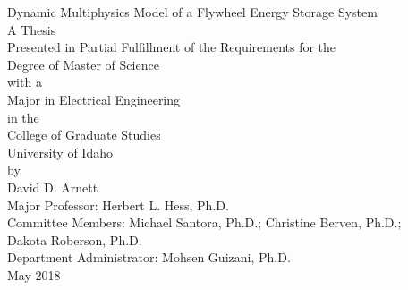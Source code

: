 \begin{titlepage}
    \begin{center}
        \vspace*{3.0cm}
        
        Dynamic Multiphysics Model of a Flywheel Energy Storage System\\
        \vspace{2cm}
        A Thesis\\
        Presented in Partial Fulfillment of the Requirements for the\\
        Degree of Master of Science\\
        with a\\
        Major in Electrical Engineering\\
        in the\\
        College of Graduate Studies\\
        University of Idaho\\
        by\\
        David D. Arnett\\
        \vspace{2.5cm}
        Major Professor: Herbert L. Hess, Ph.D.\\
        Committee Members: Michael Santora, Ph.D.; Christine Berven, Ph.D.; \\
        Dakota Roberson, Ph.D.\\
        Department Administrator: Mohsen Guizani, Ph.D.\\
        \vspace{2.5cm}
        May 2018\\     
    \end{center}
\end{titlepage}